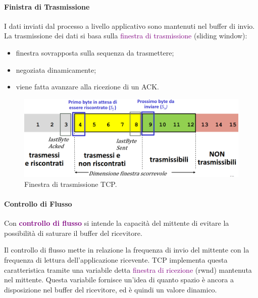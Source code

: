 \paragraph{Finistra di Trasmissione}
I dati inviati dal processo a livello applicativo sono mantenuti nel buffer di invio.
La trasmissione dei dati si basa sulla \textcolor{purple}{finestra di trasmissione} (sliding window):
\begin{itemize}
    \item finestra sovrapposta sulla sequenza da trasmettere;
    \item negoziata dinamicamente;
    \item viene fatta avanzare alla ricezione di un ACK.
\end{itemize}
\begin{figure}[h]
    \centering
    \includegraphics[scale=0.35]{Immagini/FinestraDiTrasmissione.png}
    \caption{Finestra di trasmissione TCP.}
\end{figure}

\paragraph{Controllo di Flusso}

\begin{definition}
Con \textbf{\textcolor{purple}{controllo di flusso}} si intende la capacità del mittente di evitare la possibilità di saturare il buffer del ricevitore.
\end{definition}

Il controllo di flusso mette in relazione la frequenza di invio del mittente con la frequenza di lettura dell'applicazione ricevente.
TCP implementa questa caratteristica tramite una variabile detta \textcolor{purple}{finestra di ricezione} (rwnd) mantenuta nel mittente. 
Questa variabile fornisce un'idea di quanto spazio è ancora a disposizione nel buffer del ricevitore, ed è quindi un valore dinamico. 

